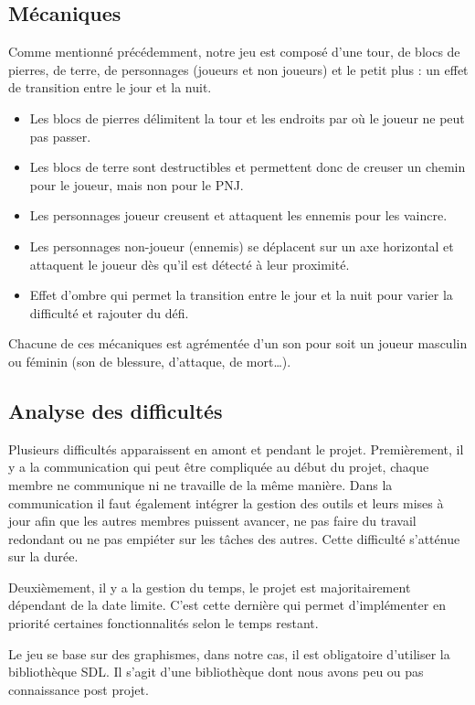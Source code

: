 \documentclass[a4paper,12pt]{article}
\begin{document}
\subsection{Mécaniques}
Comme mentionné précédemment, notre jeu est composé d'une tour, de blocs de pierres, de terre, de personnages (joueurs et non joueurs) et le petit plus : un effet de transition entre le jour et la nuit.
\begin{itemize}
	\item Les blocs de pierres délimitent la tour et les endroits par où le joueur ne peut pas passer.
	\item Les blocs de terre sont destructibles et permettent donc de creuser un chemin pour le joueur, mais non pour le PNJ.
	\item Les personnages joueur creusent et attaquent les ennemis pour les vaincre.
	\item Les personnages non-joueur (ennemis) se déplacent sur un axe horizontal et attaquent le joueur dès qu'il est détecté à leur proximité.
	\item Effet d'ombre qui permet la transition entre le jour et la nuit pour varier la difficulté et rajouter du défi.
\end{itemize}

Chacune de ces mécaniques est agrémentée d'un son pour soit un joueur masculin ou féminin (son de blessure, d'attaque, de mort\dots).


\subsection{Analyse des difficultés}
Plusieurs difficultés apparaissent en amont et pendant le projet. 
Premièrement, il y a la communication qui peut être compliquée au début du projet, chaque membre ne communique ni ne travaille de la même manière. Dans la communication il faut également intégrer la gestion des outils et leurs mises à jour afin que les autres membres puissent avancer, ne pas faire du travail redondant ou ne pas empiéter sur les tâches des autres. Cette difficulté s'atténue sur la durée.

Deuxièmement, il y a la gestion du temps, le projet est majoritairement dépendant de la date limite. C’est cette dernière qui permet d’implémenter en priorité certaines fonctionnalités selon le temps restant.

Le jeu se base sur des graphismes, dans notre cas, il est obligatoire d’utiliser la bibliothèque SDL. Il s’agit d’une bibliothèque dont nous avons peu ou pas connaissance post projet.
\end{document}

